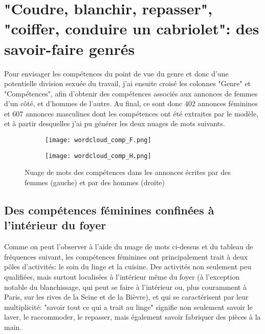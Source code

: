 \newpage

\section{"Coudre, blanchir, repasser", "coiffer, conduire un cabriolet": des savoir-faire genrés}

Pour envisager les compétences du point de vue du genre et donc d'une potentielle division sexuée du travail, j'ai ensuite croisé les colonnes "Genre" et "Compétences", afin d'obtenir des compétences associés aux annonces de femmes d'un côté, et d'hommes de l'autre. Au final, ce sont donc 402 annonces féminines et 607 annonces masculines dont les compétences ont été extraites par le modèle, et à partir desquelles j'ai pu générer les deux nuages de mots suivants.

\begin{figure}[h]
	\centering
	\begin{subfigure}[b]{0.4\textwidth}
		\centering
		\texttt{[image: wordcloud\_comp\_F.png]}
	\end{subfigure}
	\begin{subfigure}[b]{0.4\textwidth}
		\centering
		\texttt{[image: wordcloud\_comp\_H.png]}
	\end{subfigure}
	\caption{Nuage de mots des compétences dans les annonces écrites par des femmes (gauche) et par des hommes (droite)}
\end{figure}


\subsection{Des compétences féminines confinées à l'intérieur du foyer}

Comme on peut l'observer à l'aide du nuage de mots ci-dessus et du tableau de fréquences suivant, les compétences féminines ont principalement trait à deux pôles d'activités: le soin du linge et la cuisine. Des activités non seulement peu qualifiées, mais surtout localisées à l'intérieur même du foyer (à l'exception notable du blanchissage, qui peut se faire à l'intérieur ou, plus couramment à Paris, sur les rives de la Seine et de la Bièvre), et qui se caractérisent par leur multiplicité: "savoir tout ce qui a trait au linge" signifie non seulement savoir le laver, le raccommoder, le repasser, mais également savoir fabriquer des pièces à la main. 

